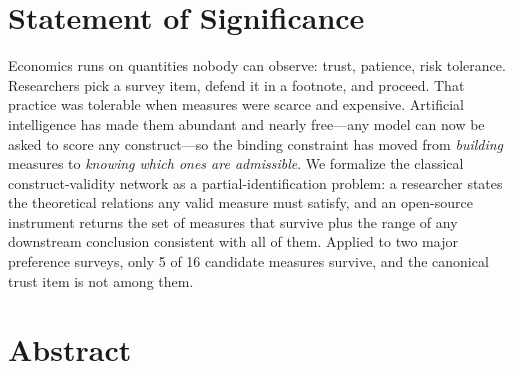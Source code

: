 \documentclass[11pt,letterpaper]{article}
\begin{document}
\vspace{0.5em}

\section*{Statement of Significance}

Economics runs on quantities nobody can observe: trust, patience, risk tolerance. Researchers pick a survey
item, defend it in a footnote, and proceed. That practice was tolerable when measures were scarce and
expensive. Artificial intelligence has made them abundant and nearly free---any model can now be asked to
score any construct---so the binding constraint has moved from \emph{building} measures to \emph{knowing
which ones are admissible}. We formalize the classical construct-validity network as a partial-identification
problem: a researcher states the theoretical relations any valid measure must satisfy, and an open-source
instrument returns the set of measures that survive plus the range of any downstream conclusion consistent
with all of them. Applied to two major preference surveys, only 5 of 16 candidate measures survive, and the
canonical trust item is not among them.

\vspace{0.4em}

\section*{Abstract}
\end{document}
